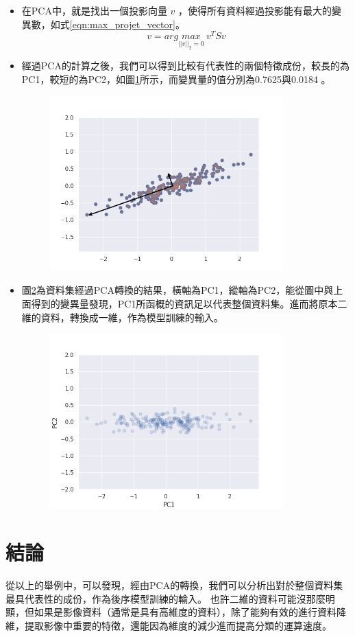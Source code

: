 \begin{itemize}
	\item
		在PCA中，就是找出一個投影向量 \(v\) ，使得所有資料經過投影能有最大的變異數，如式\ref{eqn:max_projet_vector}。
		\begin{equation}
			\label{eqn:max_projet_vector}
			v = arg \underset{||v||_2=0}{max}\  v^TSv			
		\end{equation}


		\newpage
	\item
		經過PCA的計算之後，我們可以得到比較有代表性的兩個特徵成份，較長的為PC1，較短的為PC2，如圖\ref{fig:pc1_and_pc2}所示，而變異量的值分別為0.7625與0.0184 。


	      \begin{figure}[H]
		      \centering
		      \includegraphics[width=9cm]{pic/pca_with_pca_axis.png}
		      \caption{}
		      \label{fig:pc1_and_pc2}
	      \end{figure}


	\item
	圖\ref{fig:pca_transform}為資料集經過PCA轉換的結果，橫軸為PC1，縱軸為PC2，能從圖中與上面得到的變異量發現，PC1所函概的資訊足以代表整個資料集。進而將原本二維的資料，轉換成一維，作為模型訓練的輸⼊。


	      \begin{figure}[H]
		      \centering
		      \includegraphics[width=9cm]{pic/pca_transform.png}
		      \caption{}
		      \label{fig:pca_transform}
	      \end{figure}

\end{itemize}


\section {結論}
從以上的舉例中，可以發現，經由PCA的轉換，我們可以分析出對於整個資料集最具代表性的成份，作為後序模型訓練的輸⼊。
也許二維的資料可能沒那麼明顯，但如果是影像資料（通常是具有高維度的資料），除了能夠有效的進行資料降維，提取影像中重要的特徵，還能因為維度的減少進而提高分類的運算速度。

